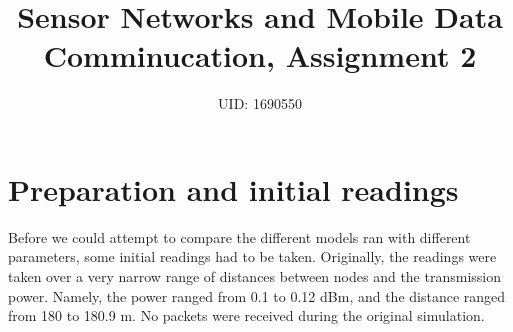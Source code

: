 \documentclass[11pt,journal]{article}
\begin{document}
	\title{Sensor Networks and Mobile Data Comminucation, Assignment 2}
	
	\author{UID: 1690550}%
	



	
	
	\maketitle
	
	
	
	
	\section{Preparation and initial readings}
	Before we could attempt to compare the different models ran with different parameters, some initial readings had to be taken. Originally, the readings were taken over a very narrow range of distances between nodes and the transmission power. Namely, the power ranged from 0.1 to 0.12 dBm, and the distance ranged from 180 to 180.9 m. No packets were received during the original simulation.
	
\end{document}
